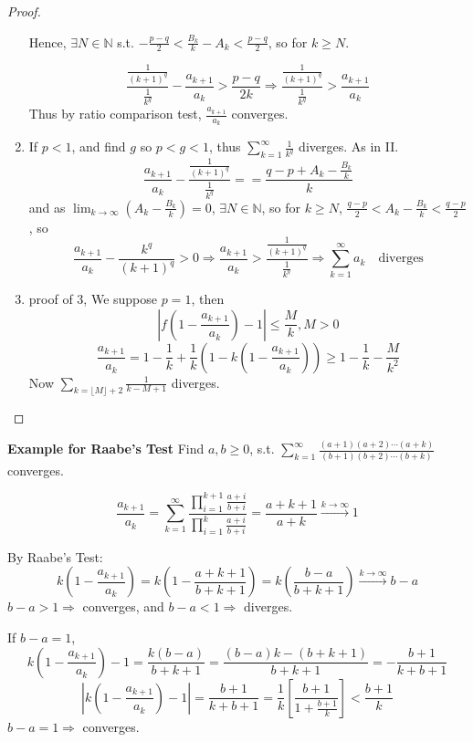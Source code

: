 \documentclass[12pt]{article}
\theoremstyle{plain}
\newcommand{\abs}[1]{\left| #1 \right|}
\newcommand{\floor}[1]{\lfloor #1 \rfloor}
\newcommand{\mN}{{\mathbb{N}}}
\begin{document}
\begin{proof}
\begin{enumerate}
	Hence, $\exists N \in \mN$ s.t. 
	$-\frac{p-q}2 < \frac{B_k}k - A_k < \frac{p-q}2$, so for $k\geq N$.

	\[
		\frac{\frac 1{(k+1)^q}}{\frac 1{k^q}} - \frac{a_{k+1}}{a_k}
		> \frac{p-q}{2k} \Rightarrow 
		\frac{\frac 1{(k+1)^q}}{\frac 1{k^q}} > \frac{a_{k+1}}{a_k}
	\]
	Thus by ratio comparison test, $\frac{a_{k+1}}{a_k}$ converges.

\item 
	If $p<1$, and find $g$ so $p < g < 1$, thus 
	$\sum_{k=1}^{\infty} \frac{1}{k^q}$ diverges. As in II. 
	\[
		\frac{a_{k+1}}{a_k} - \frac{\frac 1{(k+1)^q}}{\frac 1{k^q}} =
		 = \frac{q-p + A_k - \frac{B_k}k}{k}
	\]
	and as $\lim_{k\to\infty} (A_k - \frac{B_k}k) = 0$, $\exists N \in \mN$, 
	so for $k\geq N$, $\frac{q-p}2 < A_k - \frac{B_k}k < \frac{q-p}2$, so
	\[
		\frac{a_{k+1}}{a_k} - \frac{k^q}{(k+1)^q} > 0 \Rightarrow
		\frac{a_{k+1}}{a_k} > \frac{\frac1{(k+1)^q}}{\frac1{k^q}} 
		\Rightarrow \sum_{k=1}^{\infty} a_k 
		\quad \text{diverges}
	\]

\item 
	proof of $3$, We suppose $p = 1$, then 
	\[
		\abs{f(1-\frac{a_{k+1}}{a_k}) - 1} \leq \frac Mk, M >0	
	\]
	\[
		\frac{a_{k+1}}{a_k} = 1-\frac1k + \frac1k(1- k(1-\frac{a_{k+1}}{a_k}))
		\geq 1- \frac 1k - \frac{M}{k^2}
	\]
	Now $\sum_{k = \floor{M} + 2} \frac1{k-M+1}$ diverges. 
\end{enumerate}

\end{proof}

{\color{Brown}
\textbf{Example for Raabe's Test}
Find $a,b \geq 0$, s.t. 
$\sum_{k=1}^{\infty} \frac{(a+1)(a+2)\cdots(a+k)}{(b+1)(b+2)\cdots(b+k)}$ 
converges. 

\[
	\frac{a_{k+1}}{a_k} 
	= \sum_{k=1}^{\infty} 
	\frac{\prod_{i=1}^{k+1} \frac{a+i}{b+i}}{\prod_{i=1}^k \frac{a+i}{b+i}} 
	= \frac{a+k+1}{a+k} \overset{k\to\infty}{\longrightarrow} 1
\]

By Raabe's Test: 
\[
	k(1-\frac{a_{k+1}}{a_k}) = k(1-\frac{a+k+1}{b+k+1})
	= k(\frac{b-a}{b+k+1})
	\overset{k\to\infty}{\longrightarrow}
	b - a
\]
$b-a > 1 \Rightarrow$ converges, and $b-a < 1 \Rightarrow$ diverges.

If $b-a = 1$, 
\[
	k(1-\frac{a_{k+1}}{a_k})-1 = \frac{k(b-a)}{b+k+1} 
	= \frac{(b-a)k - (b+k+1)}{b+k+1}
	= -\frac{b+1}{k+b+1}
\]
\[
	\abs{k(1-\frac{a_{k+1}}{a_k})-1} 
	= \frac{b+1}{k+b+1} = \frac 1k [\frac{b+1}{1+\frac{b+1}k}]
	< \frac{b+1}k
\]
$b-a=1 \Rightarrow$ converges.
}	\\
\end{document}
